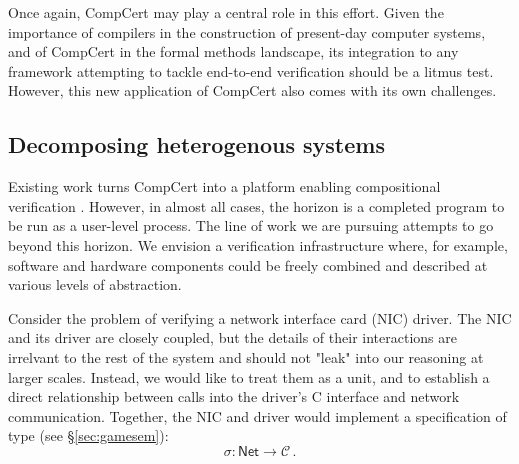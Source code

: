 \documentclass[acmsmall,authordraft]{acmart}
\newcommand{\kw}[1]{\ensuremath{ \mathsf{#1} }}
\begin{document}

Once again,
CompCert may play a central role in this effort.
Given the importance of compilers in
the construction of present-day computer systems,
and of CompCert in the formal methods landscape,
its integration to any framework
attempting to tackle end-to-end verification
should be a litmus test.
However, this new application of CompCert also
comes with its own challenges.

\subsection{Decomposing heterogenous systems}

Existing work turns CompCert
into a platform enabling compositional verification
\cite{compcompcert,sepcompcert,compcertm,vst,verasco}.
However, in almost all cases,
the horizon is a completed program to be run as a user-level process.
The line of work we are pursuing attempts to go beyond this horizon.
We envision a verification infrastructure where,
for example,
software and hardware components could be freely combined and described
at various levels of abstraction.

Consider the problem of verifying
a network interface card (NIC) driver.
The NIC and its driver are closely coupled,
but the details of their interactions
are irrelvant to the rest of the system
and should not "leak" into our reasoning at larger scales.
Instead,
we would like to treat them as a unit,
and to establish a direct relationship between calls into
the driver's C interface and network communication.
Together, the NIC and driver would implement
a specification of type (see \S\ref{sec:gamesem}):
\[ \sigma : \kw{Net} \rightarrow \mathcal{C} \,. \]
\end{document}
